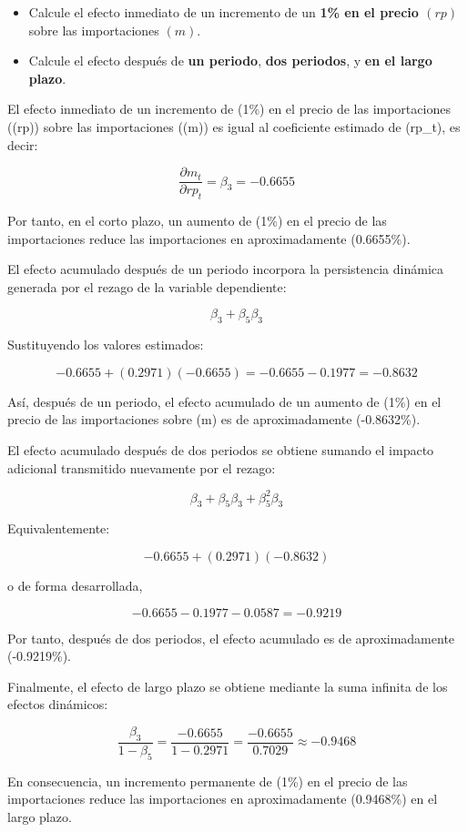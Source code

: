 \documentclass[
  11pt,
  letterpaper,
  DIV=11,
  numbers=noendperiod]{scrartcl}
\providecommand{\tightlist}{%
  \setlength{\itemsep}{0pt}\setlength{\parskip}{0pt}}
\begin{document}
\begin{itemize}
\tightlist
\item
  Calcule el efecto inmediato de un incremento de un \textbf{1\% en el
  precio \((rp)\)} sobre las importaciones \((m)\).
\item
  Calcule el efecto después de \textbf{un periodo}, \textbf{dos
  periodos}, y \textbf{en el largo plazo}.
\end{itemize}

El efecto inmediato de un incremento de (1\%) en el precio de las
importaciones ((rp)) sobre las importaciones ((m)) es igual al
coeficiente estimado de (rp\_t), es decir:

\[
\frac{\partial m_t}{\partial rp_t} = \beta_3 = -0.6655
\]

Por tanto, en el corto plazo, un aumento de (1\%) en el precio de las
importaciones reduce las importaciones en aproximadamente (0.6655\%).

El efecto acumulado después de un periodo incorpora la persistencia
dinámica generada por el rezago de la variable dependiente:

\[
\beta_3 + \beta_5 \beta_3
\]

Sustituyendo los valores estimados:

\[
-0.6655 + (0.2971)(-0.6655) = -0.6655 - 0.1977 = -0.8632
\]

Así, después de un periodo, el efecto acumulado de un aumento de (1\%)
en el precio de las importaciones sobre (m) es de aproximadamente
(-0.8632\%).

El efecto acumulado después de dos periodos se obtiene sumando el
impacto adicional transmitido nuevamente por el rezago:

\[
\beta_3 + \beta_5 \beta_3 + \beta_5^2 \beta_3
\]

Equivalentemente:

\[
-0.6655 + (0.2971)(-0.8632)
\]

o de forma desarrollada,

\[
-0.6655 - 0.1977 - 0.0587 = -0.9219
\]

Por tanto, después de dos periodos, el efecto acumulado es de
aproximadamente (-0.9219\%).

Finalmente, el efecto de largo plazo se obtiene mediante la suma
infinita de los efectos dinámicos:

\[
\frac{\beta_3}{1-\beta_5}
=
\frac{-0.6655}{1-0.2971}
=
\frac{-0.6655}{0.7029}
\approx -0.9468
\]

En consecuencia, un incremento permanente de (1\%) en el precio de las
importaciones reduce las importaciones en aproximadamente (0.9468\%) en
el largo plazo.
\end{document}
